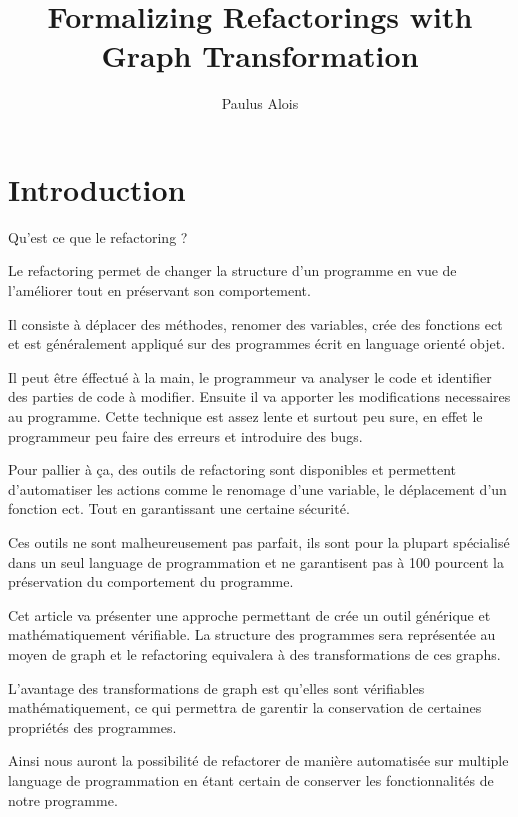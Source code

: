 \documentclass[a4paper, 12pt]{article}
\title{Formalizing Refactorings with Graph Transformation}
\author{Paulus Alois}
\begin{document}
  \maketitle

  \tableofcontents

  \newpage

  \section{Introduction}

  Qu'est ce que le refactoring ?

  Le refactoring permet de changer la structure d'un programme en vue de l'améliorer tout en préservant son comportement.

  Il consiste à déplacer des méthodes, renomer des variables, crée des fonctions ect et est généralement appliqué sur des programmes écrit en language orienté objet.

  Il peut être éffectué à la main, le programmeur va analyser le code et identifier des parties de code à modifier. Ensuite il va apporter les modifications necessaires au programme.
  Cette technique est assez lente et surtout peu sure, en effet le programmeur peu faire des erreurs et introduire des bugs.

  Pour pallier à ça, des outils de refactoring sont disponibles et permettent d'automatiser les actions comme le renomage d'une variable, le déplacement d'un fonction ect. Tout en garantissant une certaine sécurité.

  Ces outils ne sont malheureusement pas parfait, ils sont pour la plupart spécialisé dans un seul language de programmation et ne garantisent pas à 100 pourcent la préservation du comportement du programme.

  Cet article va présenter une approche permettant de crée un outil générique et mathématiquement vérifiable. La structure des programmes sera représentée au moyen de graph et le refactoring equivalera à des transformations de ces graphs.

  L'avantage des transformations de graph est qu'elles sont vérifiables mathématiquement, ce qui permettra de garentir la conservation de certaines propriétés des programmes.

  Ainsi nous auront la possibilité de refactorer de manière automatisée sur multiple language de programmation en étant certain de conserver les fonctionnalités de notre programme.

  \newpage
\end{document}
